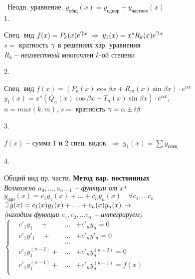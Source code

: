 \documentclass[11pt,a4paper]{article}
\newcommand{\romannum}[1]{\MakeUppercase{\romannumeral #1}}
\newcommand*\circled[1]{\tikz[baseline=(char.base)]{\node[shape=circle,draw,inner sep=2pt] (char) {#1};}}
\newcommand{\newgamma}{\raisebox{0.05em}{$\gamma$}}
\def\letus{%
    \mathord{\setbox0=\hbox{$\exists$}%
             \hbox{\kern 0.125\wd0%
                   \vbox to \ht0{%
                      \hrule width 0.75\wd0%
                      \vfill%
                      \hrule width 0.75\wd0}%
                   \vrule height \ht0%
                   \kern 0.125\wd0}%
           }%
    \,
}
\newcommand{\infers}{\,\to\,}
\newcommand{\textinfers}{\;\Rightarrow\;}
\newcommand{\bfend}{\textbf{--} }
\newcommand{\htext}{0.46\textwidth}
\begin{document}
{\circled{\romannum{2}}\parbox[t][]{\htext}{\noindent\, Неодн. уравнение. $y_{\text{общ}}(x) =  y_{\text{однор}} + y_{\text{частное}}(x)$\\
1. \parbox[t][]{\htext}{Спец. вид $f(x) = P_k(x) e^{\newgamma x}\; \Rightarrow\; y_1(x) = x^s R_k(x) e^{\newgamma x}$\\
$s = $ кратность $\newgamma$ в решениях хар. уравнения\\
$R_k$ \bfend {\it неизвестный} многочлен $k$-ой степени\vspace{0.25em}
}
2. \parbox[t][]{\htext}{Спец. вид $f(x) = (P_k(x)\cos \beta x + R_m(x)\sin \beta x)\cdot e^{\alpha x}$\\
$y_1(x) = x^s (Q_n(x)\cos \beta x + T_n(x)\sin \beta x)\cdot e^{\alpha x}$,\\
$n = max(k, m)$, $s = $ кратность $\newgamma = \alpha \pm i\beta$\vspace{0.25em}
}
3. \parbox[t][]{\htext}{$f(x)$ \bfend сумма 1 и 2 спец. видов $\textinfers y_1(x) = \sum y_{\text{спец}}$\vspace{1em}
}
4. \parbox[t][]{\htext}{Общий вид пр. части.\! {\bf Метод вар. постоянных}\\
\small{\it Возможно $a_0, \ldots, a_{n-1}$ \bfend функции от $x$!}\\
\romannum{1} \quad $y_{\text{одн}}(x) = c_1 y_1(x) + \ldots + c_n y_n(x) \quad\forall c_1,\ldots c_n$\\
\romannum{2} \quad $\letus y(x) = c_1(x) y_1(x) + \ldots + c_n(x) y_n(x) \infers$\\
\small{\it (находим функции $c_1, c_2, \ldots c_n$ \bfend интегрируем)}\vspace{0.5em}\\
$\left\{ \begin{aligned}
& c'_1 y_1 \quad + &\ldots& + c'_n y_n = 0\\
& c'_1 y'_1 \quad + & \ldots& + c'_n y'_n = 0\\
& &\ldots&\\
& c'_1 y^{(n - 2)}_1 + & \ldots& + c'_n y^{(n - 2)}_n = 0\\
& c'_1 y^{(n - 1)}_1 + & \ldots& + c'_n y^{(n - 1)}_n = f(x)\\
\end{aligned} \right. $\\
}\vspace{1em}
}

}
\end{document}
